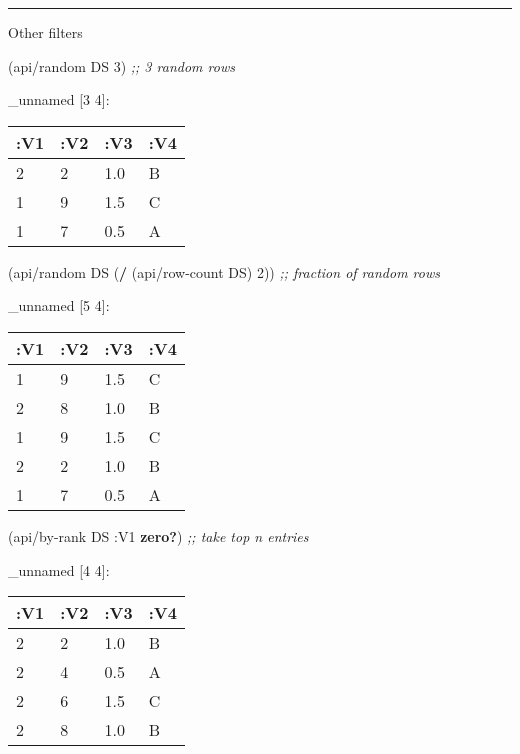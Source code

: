\documentclass[]{article}
\newenvironment{Shaded}{\begin{snugshade}}{\end{snugshade}}
\newcommand{\AttributeTok}[1]{\textcolor[rgb]{0.77,0.63,0.00}{#1}}
\newcommand{\CommentTok}[1]{\textcolor[rgb]{0.56,0.35,0.01}{\textit{#1}}}
\newcommand{\DecValTok}[1]{\textcolor[rgb]{0.00,0.00,0.81}{#1}}
\newcommand{\KeywordTok}[1]{\textcolor[rgb]{0.13,0.29,0.53}{\textbf{#1}}}
\newcommand{\NormalTok}[1]{#1}
\begin{document}
\begin{center}\rule{0.5\linewidth}{0.5pt}\end{center}

Other filters

\begin{Shaded}
\begin{Highlighting}[]
\NormalTok{(api/random DS }\DecValTok{3}\NormalTok{) }\CommentTok{;; 3 random rows}
\end{Highlighting}
\end{Shaded}

\_unnamed {[}3 4{]}:

\begin{longtable}[]{@{}llll@{}}
\toprule
:V1 & :V2 & :V3 & :V4\tabularnewline
\midrule
\endhead
2 & 2 & 1.0 & B\tabularnewline
1 & 9 & 1.5 & C\tabularnewline
1 & 7 & 0.5 & A\tabularnewline
\bottomrule
\end{longtable}

\begin{Shaded}
\begin{Highlighting}[]
\NormalTok{(api/random DS (}\KeywordTok{/}\NormalTok{ (api/row-count DS) }\DecValTok{2}\NormalTok{)) }\CommentTok{;; fraction of random rows}
\end{Highlighting}
\end{Shaded}

\_unnamed {[}5 4{]}:

\begin{longtable}[]{@{}llll@{}}
\toprule
:V1 & :V2 & :V3 & :V4\tabularnewline
\midrule
\endhead
1 & 9 & 1.5 & C\tabularnewline
2 & 8 & 1.0 & B\tabularnewline
1 & 9 & 1.5 & C\tabularnewline
2 & 2 & 1.0 & B\tabularnewline
1 & 7 & 0.5 & A\tabularnewline
\bottomrule
\end{longtable}

\begin{Shaded}
\begin{Highlighting}[]
\NormalTok{(api/by-rank DS }\AttributeTok{:V1} \KeywordTok{zero?}\NormalTok{) }\CommentTok{;; take top n entries}
\end{Highlighting}
\end{Shaded}

\_unnamed {[}4 4{]}:

\begin{longtable}[]{@{}llll@{}}
\toprule
:V1 & :V2 & :V3 & :V4\tabularnewline
\midrule
\endhead
2 & 2 & 1.0 & B\tabularnewline
2 & 4 & 0.5 & A\tabularnewline
2 & 6 & 1.5 & C\tabularnewline
2 & 8 & 1.0 & B\tabularnewline
\bottomrule
\end{longtable}
\end{document}
